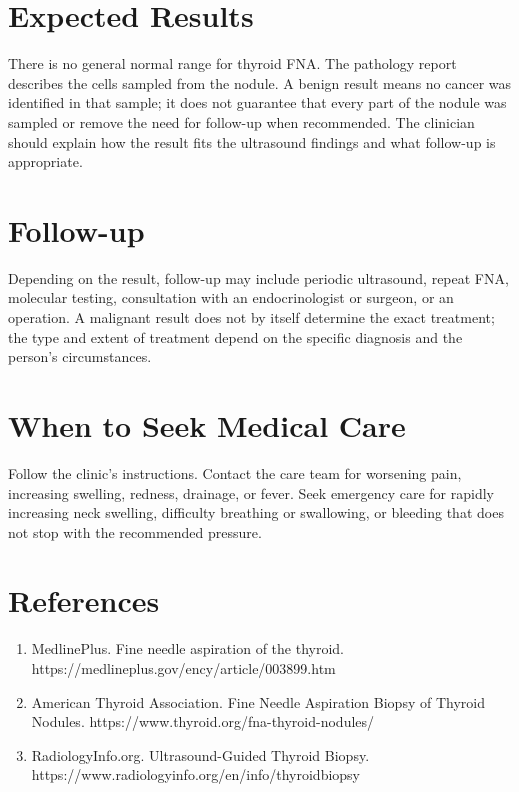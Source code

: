 \section*{Expected Results}
There is no general normal range for thyroid FNA. The pathology report describes the cells sampled from the nodule. A benign result means no cancer was identified in that sample; it does not guarantee that every part of the nodule was sampled or remove the need for follow-up when recommended. The clinician should explain how the result fits the ultrasound findings and what follow-up is appropriate.

\section*{Follow-up}
Depending on the result, follow-up may include periodic ultrasound, repeat FNA, molecular testing, consultation with an endocrinologist or surgeon, or an operation. A malignant result does not by itself determine the exact treatment; the type and extent of treatment depend on the specific diagnosis and the person's circumstances.

\section*{When to Seek Medical Care}
Follow the clinic's instructions. Contact the care team for worsening pain, increasing swelling, redness, drainage, or fever. Seek emergency care for rapidly increasing neck swelling, difficulty breathing or swallowing, or bleeding that does not stop with the recommended pressure.

\section*{References}
\begin{enumerate}
  \item MedlinePlus. Fine needle aspiration of the thyroid. https://medlineplus.gov/ency/article/003899.htm
  \item American Thyroid Association. Fine Needle Aspiration Biopsy of Thyroid Nodules. https://www.thyroid.org/fna-thyroid-nodules/
  \item RadiologyInfo.org. Ultrasound-Guided Thyroid Biopsy. https://www.radiologyinfo.org/en/info/thyroidbiopsy
\end{enumerate}
\clearpage
